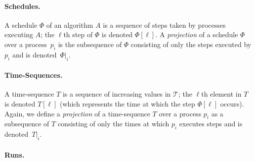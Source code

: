 \documentclass[11pt]{article}
\newcommand{\T}{\mathcal{T}}
\begin{document}
\paragraph{Schedules.} 

A schedule $\Phi$ of an algorithm $A$ is a sequence of steps taken by
     processes executing $A$; the $\ell$th step of $\Phi$ is denoted
     $\Phi[\ell]$.
A \emph{projection} of a schedule $\Phi$ over a process~$p_i$ is the
     subsequence of $\Phi$ consisting of only the steps executed by
     $p_i$ and is denoted~$\Phi|_{i}$.




\paragraph{Time-Sequences.} 

A time-sequence $T$ is a sequence of increasing values in $\T$; the
     $\ell$th element in $T$ is denoted $T[\ell]$ (which represents
     the time at which the step $\Phi[\ell]$ occurs).
Again, we define a \emph{projection} of a time-sequence $T$ over a
     process $p_i$ as a subsequence of $T$ consisting of only the
     times at which $p_i$ executes steps and is denoted~$T|_i$.




\paragraph{Runs.}
\end{document}
